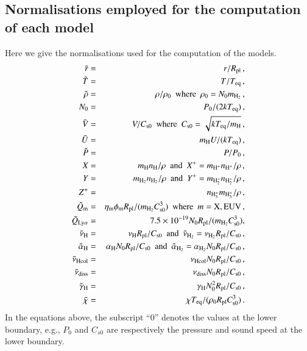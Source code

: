 \documentclass{aa}
\begin{document}
\begin{appendix}
%
\section{Normalisations employed for the computation of each model}\label{apx:B}
%
Here we give the normalisations used for the computation of the models.
%
\begin{eqnarray*}
\tilde{r} &=& r/R_{\rm pl}\,, \\
\tilde{T} &=& T/T_{\rm eq}\,, \\
\tilde{\rho} &=& \rho/\rho_{0}~~{\rm where}~~\rho_{0} = N_{0}m_{\rm H_2}\,, \\
N_{0} &=& P_0/(2kT_{\rm eq})\,, \\
\tilde{V} &=& V/C_{\rm s0}~~{\rm where}~~C_{\rm s0} = \sqrt{kT_{\rm eq}/m_{\rm H}}\,, \\
\tilde{U} &=& m_{\rm H}U/(kT_{\rm eq})\,, \\
\tilde{P} &=& P/P_0\,, \\
X &=& m_{\rm H}n_{\rm H}/\rho~~{\rm and}~~X^+ = m_{\rm H^+}n_{\rm H^+}/\rho\,, \\
Y &=& m_{\rm H_2}n_{\rm H_2}/\rho~~{\rm and}~~Y^+ = m_{\rm H_2^+}n_{\rm H_2^+}/\rho\,, \\
Z^+ &=& n_{\rm H_3^+}m_{\rm H_3^+}/\rho\,, \\
\tilde{Q}_{\rm m} &=& \eta_{\rm m}\phi_{\rm m}R_{\rm pl}/(m_{\rm H_2}C_{\rm s0}^3)~~{\rm where}~~m = {\rm X, EUV}\,, \\
\tilde{Q}_{\rm Ly\alpha} &=& 7.5\times10^{-19}N_0R_{\rm pl}/(m_{\rm H_2}C_{\rm s0}^3), \\
\tilde{\nu}_{\rm H} &=& \nu_{\rm H}R_{\rm pl}/C_{\rm s0}~~{\rm
and}~~\tilde{\nu}_{\rm H_2} =
\nu_{\rm H_2}R_{\rm pl}/C_{\rm s0}\,, \\
\tilde{\alpha}_{\rm H} &=& \alpha_{\rm H}N_0R_{\rm pl}/C_{\rm s0}~~{\rm and}~~\tilde{\alpha}_{\rm H_2} = \alpha_{\rm H_2}N_0R_{\rm pl}/C_{\rm s0}\,, \\
\tilde{\nu}_{\rm Hcol} &=& \nu_{\rm Hcol}N_0R_{\rm pl}/C_{\rm s0}\,, \\
\tilde{\nu}_{\rm diss} &=& \nu_{\rm diss}N_0R_{\rm pl}/C_{\rm s0}\,, \\
\tilde{\gamma}_{\rm H} &=& \gamma_{\rm H}N_0^2R_{\rm pl}/C_{\rm s0}\,, \\
\tilde{\chi} &=& \chi T_{\rm eq}/(\rho_0R_{\rm pl}C_{\rm s0}^3)\,.
\end{eqnarray*}
%
In the equations above, the subscript ``0'' denotes the values at the lower boundary, e.g., $P_0$ and $C_{s0}$ are respectively the pressure and sound speed at the lower boundary.
%



\end{appendix}
\end{document}
